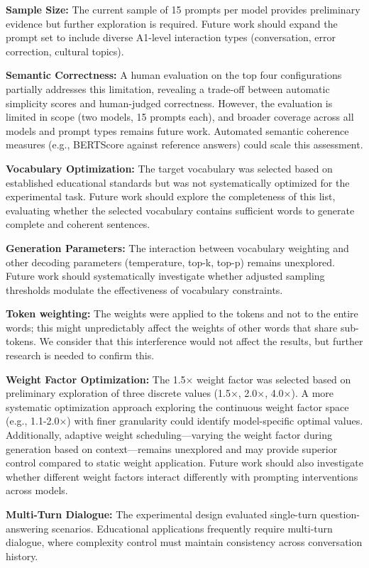 \documentclass[10pt, a4paper]{article}
\begin{document}
\textbf{Sample Size:} The current sample of 15 prompts per model provides preliminary evidence but further exploration is required. Future work should expand the prompt set to include diverse A1-level interaction types (conversation, error correction, cultural topics).

\textbf{Semantic Correctness:} A human evaluation on the top four configurations partially addresses this limitation, revealing a trade-off between automatic simplicity scores and human-judged correctness. However, the evaluation is limited in scope (two models, 15 prompts each), and broader coverage across all models and prompt types remains future work. Automated semantic coherence measures (e.g., BERTScore against reference answers) could scale this assessment.

\textbf{Vocabulary Optimization:} The target vocabulary was selected based on established educational standards but was not systematically optimized for the experimental task. Future work should explore the completeness of this list, evaluating whether the selected vocabulary contains sufficient words to generate complete and coherent sentences.

\textbf{Generation Parameters:} The interaction between vocabulary weighting and other decoding parameters (temperature, top-k, top-p) remains unexplored. Future work should systematically investigate whether adjusted sampling thresholds modulate the effectiveness of vocabulary constraints.

\textbf{Token weighting:} The weights were applied to the tokens and not to the entire words; this might unpredictably affect the weights of other words that share sub-tokens. We consider that this interference would not affect the results, but further research is needed to confirm this.

\textbf{Weight Factor Optimization:} The 1.5× weight factor was selected based on preliminary exploration of three discrete values (1.5×, 2.0×, 4.0×). A more systematic optimization approach exploring the continuous weight factor space (e.g., 1.1-2.0×) with finer granularity could identify model-specific optimal values. Additionally, adaptive weight scheduling—varying the weight factor during generation based on context—remains unexplored and may provide superior control compared to static weight application. Future work should also investigate whether different weight factors interact differently with prompting interventions across models.

\textbf{Multi-Turn Dialogue:} The experimental design evaluated single-turn question-answering scenarios. Educational applications frequently require multi-turn dialogue, where complexity control must maintain consistency across conversation history.
\end{document}
